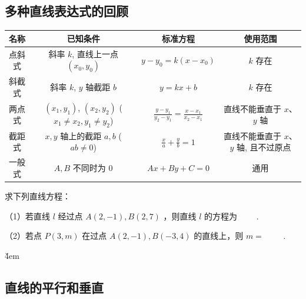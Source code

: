 \subsection{多种直线表达式的回顾}
\begin{center}
    \begin{tabular}{|c|c|c|c|}
        \hline
        \textbf{名称} & \textbf{已知条件}                                             & \textbf{标准方程}                                   & \textbf{使用范围}            \\
        \hline
        点斜式         & 斜率 $k$, 直线上一点 $(x_0,y_0)$                                 & $y-y_0 = k(x-x_0)$                              & $k$ 存在                   \\
        \hline
        斜截式         & 斜率 $k$, $y$ 轴截距 $b$                                       & $y=kx+b$                                        & $k$ 存在                   \\
        \hline
        两点式         & $(x_1, y_1)$, $(x_2, y_2)$ ($x_1 \neq x_2, y_1 \neq y_2$) & $\frac{y-y_1}{y_2-y_1} = \frac{x-x_1}{x_2-x_1}$ & 直线不能垂直于 $x$、$y$ 轴        \\
        \hline
        截距式         & $x,y$ 轴上的截距 $a,b$ ($ab \neq 0$)                           & $\frac{x}{a} + \frac{y}{b} = 1$                 & 直线不能垂直于 $x$、$y$ 轴, 且不过原点 \\
        \hline
        一般式         & $A, B$ 不同时为 $0$                                           & $Ax+By+C=0$                                     & 通用                       \\
        \hline
    \end{tabular}
\end{center}

\begin{problem}
求下列直线方程：

（1）若直线 $l$ 经过点 $A(2,-1), B(2,7)$ ，则直线 $l$ 的方程为 \underline{$\qquad$}.

（2）若点 $P(3, m)$ 在过点 $A(2,-1), B(-3,4)$ 的直线上，则 $m=$ \underline{$\qquad$}.
\end{problem}

\v{4em}

\subsection{直线的平行和垂直}

